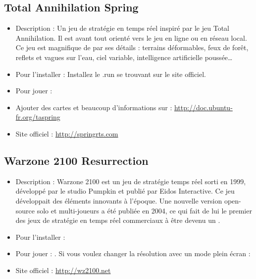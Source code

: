 \subsection{Total Annihilation Spring}
\begin{itemize}
\begingroup
{}
\item Description : Un jeu de stratégie en temps réel inspiré par le jeu Total Annihilation. Il est avant tout orienté vers le jeu en ligne ou en réseau local. Ce jeu est magnifique de par ses détails : terrains déformables, feux de forêt, reflets et vagues sur l'eau, ciel variable, intelligence artificielle poussée\ldots{}{\par}
\endgroup
\item Pour l'installer : Installez le .run se trouvant sur le site officiel.{\par}
\item Pour jouer : 
\item Ajouter des cartes et beaucoup d'informations sur : \url{http://doc.ubuntu-fr.org/taspring}{\par}
\item Site officiel : \url{http://springrts.com}{\par}
\end{itemize}
\subsection{Warzone 2100 Resurrection}
\begin{itemize}
\begingroup
{}
\item Description : Warzone 2100 est un jeu de stratégie temps réel sorti en 1999, développé par le studio Pumpkin et publié par Eidos Interactive. Ce jeu développait des éléments innovants à l'époque.  Une nouvelle version open-source solo et multi-joueurs a été publiée en 2004, ce qui fait de lui le premier des jeux de stratégie en temps réel commerciaux à être devenu un .{\par}
\endgroup
\item Pour l'installer : 
\item Pour jouer : . Si vous voulez changer la résolution avec un mode plein écran : 
\item Site officiel : \url{http://wz2100.net}{\par}
\end{itemize}
